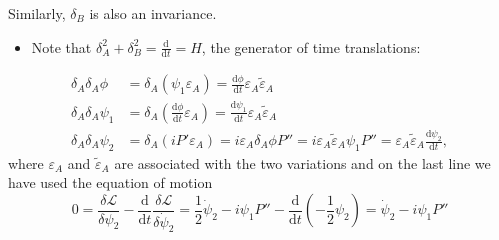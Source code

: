Similarly, $\delta_B$ is also an invariance.
\begin{itemize}
    \item Note that $\delta_A^2 + \delta_B^2 = \frac{\text{d}}{\text{d}t} = H$, the generator of time translations:
\end{itemize}
\begin{align}
    \delta_A \delta_A \phi &= \delta_A(\psi_1 \varepsilon_A) =\frac{\text{d}\phi}{\text{d}t} \varepsilon_A \tilde\varepsilon_A \\
    \delta_A \delta_A \psi_1 &= \delta_A\left(\frac{\text{d}\phi}{\text{d}t} \varepsilon_A\right) = \frac{\text{d}\psi_1}{\text{d}t}\varepsilon_A \tilde\varepsilon_A \\
    \delta_A \delta_A\psi_2 &= \delta_A(i P' \varepsilon_A) = i \varepsilon_A \delta_A\phi P'' = i \varepsilon_A \tilde\varepsilon_A \psi_1 P'' = \varepsilon_A \tilde\varepsilon_A \frac{\text{d}\psi_2}{\text{d}t},
\end{align}
where $\varepsilon_A$ and $\tilde\varepsilon_A$ are associated with the two variations and on the last line we have used the equation of motion
\begin{equation}
    0 = \frac{\delta \mathcal{L}}{\delta \psi_2} - \frac{\text{d}}{\text{d}t}\frac{\delta \mathcal{L}}{\delta \dot{\psi}_2} = \frac{1}{2}\dot{\psi}_2 - i \psi_1 P'' - \frac{\text{d}}{\text{d}t}(-\frac{1}{2}\psi_2) = \dot{\psi}_2 - i \psi_1 P''
\end{equation}

